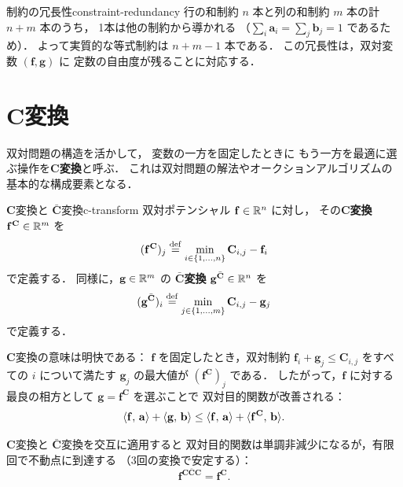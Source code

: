 \begin{remark}{制約の冗長性}{constraint-redundancy}
行の和制約 $n$ 本と列の和制約 $m$ 本の計 $n+m$ 本のうち，
1本は他の制約から導かれる
（$\sum_i \mathbf{a}_i = \sum_j \mathbf{b}_j = 1$ であるため）．
よって実質的な等式制約は $n+m-1$ 本である．
この冗長性は，双対変数 $(\mathbf{f}, \mathbf{g})$ に
定数の自由度が残ることに対応する．
\end{remark}


\section{$\mathbf{C}$変換}\label{sec:c-transform}

双対問題の構造を活かして，
変数の一方を固定したときに
もう一方を最適に選ぶ操作を\textbf{$\mathbf{C}$変換}と呼ぶ．
これは双対問題の解法やオークションアルゴリズムの
基本的な構成要素となる．

\begin{definition}{$\mathbf{C}$変換と $\bar{\mathbf{C}}$変換}{c-transform}
双対ポテンシャル $\mathbf{f} \in \mathbb{R}^n$ に対し，
その\textbf{$\mathbf{C}$変換} $\mathbf{f}^{\mathbf{C}} \in \mathbb{R}^m$ を
\begin{equation}\label{eq:c-transform}
  (\mathbf{f}^{\mathbf{C}})_j
  \overset{\mathrm{def}}{=} \min_{i \in \{1,\ldots,n\}} \mathbf{C}_{i,j} - \mathbf{f}_i
\end{equation}
で定義する．
同様に，$\mathbf{g} \in \mathbb{R}^m$ の
$\bar{\mathbf{C}}$\textbf{変換} $\mathbf{g}^{\bar{\mathbf{C}}} \in \mathbb{R}^n$ を
\begin{equation}\label{eq:cbar-transform}
  (\mathbf{g}^{\bar{\mathbf{C}}})_i
  \overset{\mathrm{def}}{=} \min_{j \in \{1,\ldots,m\}} \mathbf{C}_{i,j} - \mathbf{g}_j
\end{equation}
で定義する．
\end{definition}

$\mathbf{C}$変換の意味は明快である：
$\mathbf{f}$ を固定したとき，双対制約
$\mathbf{f}_i + \mathbf{g}_j \leq \mathbf{C}_{i,j}$
をすべての $i$ について満たす $\mathbf{g}_j$ の最大値が
$(\mathbf{f}^{\mathbf{C}})_j$ である．
したがって，$\mathbf{f}$ に対する最良の相方として
$\mathbf{g} = \mathbf{f}^{\mathbf{C}}$ を選ぶことで
双対目的関数が改善される：
\[
  \langle \mathbf{f},\, \mathbf{a} \rangle + \langle \mathbf{g},\, \mathbf{b} \rangle
  \leq
  \langle \mathbf{f},\, \mathbf{a} \rangle + \langle \mathbf{f}^{\mathbf{C}},\, \mathbf{b} \rangle.
\]

$\mathbf{C}$変換と $\bar{\mathbf{C}}$変換を交互に適用すると
双対目的関数は単調非減少になるが，有限回で不動点に到達する
（3回の変換で安定する）：
\[
  \mathbf{f}^{\mathbf{C}\bar{\mathbf{C}}\mathbf{C}} = \mathbf{f}^{\mathbf{C}}.
\]

